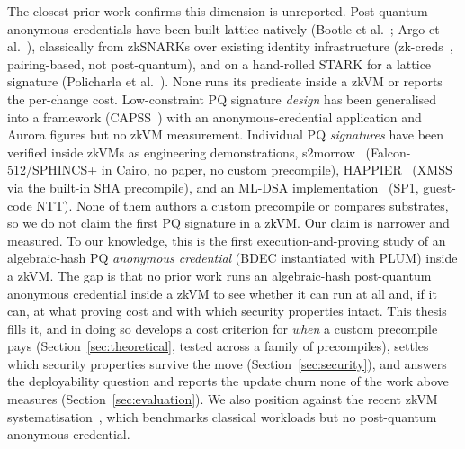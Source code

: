 The closest prior work confirms this dimension is unreported. Post-quantum anonymous credentials have been built lattice-natively (Bootle et al.~\cite{BootleLNS23}; Argo et al.~\cite{ArgoGJLRS24}), classically from zkSNARKs over existing identity infrastructure (zk-creds~\cite{rosenberg2023zkcreds}, pairing-based, not post-quantum), and on a hand-rolled STARK for a lattice signature (Policharla et al.~\cite{policharla2023pqprivacypass}). None runs its predicate inside a zkVM or reports the per-change cost. Low-constraint PQ signature \emph{design} has been generalised into a framework (CAPSS~\cite{feneuil2025capss}) with an anonymous-credential application and Aurora figures but no zkVM measurement. Individual PQ \emph{signatures} have been verified inside zkVMs as engineering demonstrations, s2morrow~\cite{s2morrow2025} (Falcon-512/SPHINCS+ in Cairo, no paper, no custom precompile), HAPPIER~\cite{saygan2026happier} (XMSS via the built-in SHA precompile), and an ML-DSA implementation~\cite{kota2025dilithiumzk} (SP1, guest-code NTT). None of them authors a custom precompile or compares substrates, so we do not claim the first PQ signature in a zkVM. Our claim is narrower and measured. To our knowledge, this is the first execution-and-proving study of an algebraic-hash PQ \emph{anonymous credential} (BDEC instantiated with PLUM) inside a zkVM. The gap is that no prior work runs an algebraic-hash post-quantum anonymous credential inside a zkVM to see whether it can run at all and, if it can, at what proving cost and with which security properties intact. This thesis fills it, and in doing so develops a cost criterion for \emph{when} a custom precompile pays (Section~\ref{sec:theoretical}, tested across a family of precompiles), settles which security properties survive the move (Section~\ref{sec:security}), and answers the deployability question and reports the update churn none of the work above measures (Section~\ref{sec:evaluation}). We also position against the recent zkVM systematisation~\cite{yang2026sokzkvm}, which benchmarks classical workloads but no post-quantum anonymous credential.
